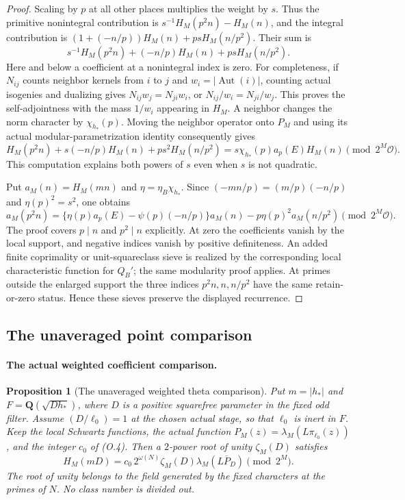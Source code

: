 \documentclass[11pt]{article}
\newtheorem{proposition}[theorem]{Proposition}
\theoremstyle{definition}
\theoremstyle{remark}
\begin{document}
\begin{proof}
Scaling by $p$ at all other places multiplies the weight by $s$.
Thus the primitive nonintegral contribution is
$s^{-1}H_M(p^2n)-H_M(n)$, and the integral contribution is
$(1+(-n/p))H_M(n)+psH_M(n/p^2)$.  Their sum is
\[
 s^{-1}H_M(p^2n)+(-n/p)H_M(n)+psH_M(n/p^2).
\]
Here and below a coefficient at a nonintegral index is zero.
For completeness, if $N_{ij}$ counts neighbor kernels from
$i$ to $j$ and $w_i=|\operatorname{Aut}(i)|$, counting actual
isogenies and dualizing gives
$N_{ij}w_j=N_{ji}w_i$, or $N_{ij}/w_i=N_{ji}/w_j$.
This proves the self-adjointness with the mass $1/w_i$ appearing
in $H_M$.  A neighbor changes the norm character by
$\chi_{h_*}(p)$.  Moving the neighbor operator onto $P_M$ and
using its actual modular-parametrization identity consequently
gives
\[
 H_M(p^2n)+s(-n/p)H_M(n)+ps^2H_M(n/p^2)
     =s\chi_{h_*}(p)a_p(E)H_M(n)\pmod {2^M\mathcal O}.
\]
This computation explains both powers of $s$ even when $s$ is
not quadratic.

Put $a_M(n)=H_M(mn)$ and
$\eta=\eta_B\chi_{h_*}$.  Since
$(-mn/p)=(m/p)(-n/p)$ and $\eta(p)^2=s^2$, one obtains
\[
 a_M(p^2n)=
 \{\eta(p)a_p(E)-\psi(p)(-n/p)\}a_M(n)
        -p\eta(p)^2a_M(n/p^2)\pmod {2^M\mathcal O}. \tag{O.6}
\]
The proof covers $p\mid n$ and $p^2\mid n$ explicitly.
At zero the coefficients vanish by the local support, and negative
indices vanish by positive definiteness.
An added finite coprimality or unit-squareclass sieve is realized
by the corresponding local characteristic function for $Q_B'$;
the same modularity proof applies.  At primes outside the enlarged
support the three indices $p^2n,n,n/p^2$ have the same retain-or-zero
status.  Hence these sieves preserve the displayed recurrence.
\end{proof}

\subsection{The unaveraged point comparison}
\paragraph{The actual weighted coefficient comparison.}
\begin{proposition}[The unaveraged weighted theta comparison]
\label{ex:app-theta-comparison}
Put $m=|h_*|$ and $F=\mathbf Q(\sqrt{Dh_*})$, where $D$ is a
positive squarefree parameter in the fixed odd filter. Assume
$(D/\ell_0)=1$ at the chosen actual stage, so that $\ell_0$ is
inert in $F$. Keep the local Schwartz functions, the actual function
$P_M(z)=\lambda_M(L\pi_{\ell_0}(z))$, and the integer $c_0$
of (O.4). Then a $2$-power root of unity $\zeta_M(D)$ satisfies
\[
 H_M(mD)=c_0\,2^{\omega(N)}\zeta_M(D)
                   \lambda_M(\overline{LP_D})\pmod {2^M}.\tag{O.7}
\]
The root of unity belongs to the field generated by the fixed
characters at the primes of $N$. No class number is divided out.
\end{proposition}
\end{document}
